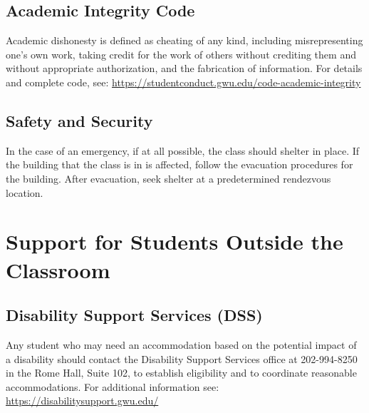 \documentclass[pdftex,11pt]{artikel3}
\begin{document}
\subsection{Academic Integrity Code}
Academic dishonesty is defined as cheating of any kind, including misrepresenting one's own work, taking credit for the work of others without crediting them and without appropriate authorization, and the fabrication of information. For details and complete code, see: \url{https://studentconduct.gwu.edu/code-academic-integrity}

\subsection{Safety and Security}
In the case of an emergency, if at all possible, the class should shelter in place. If the building that the class is in  is affected, follow the evacuation procedures for the building. After evacuation, seek shelter at a predetermined rendezvous location.

\section{Support for Students Outside the Classroom}

\subsection{Disability Support Services (DSS)}
Any student who may need an accommodation based on the potential impact of a disability should contact the Disability Support Services office at 202-994-8250 in the Rome Hall, Suite 102, to establish eligibility and to coordinate reasonable accommodations. For additional information see: \url{https://disabilitysupport.gwu.edu/}

\end{document}
